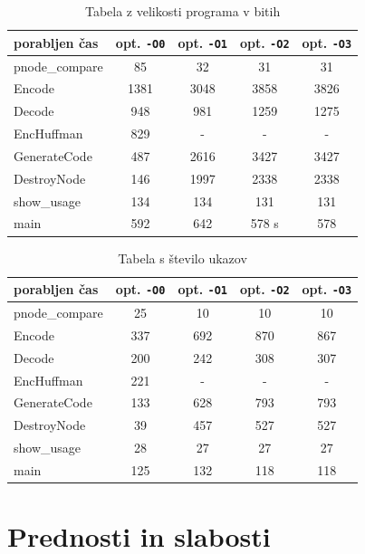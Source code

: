 \documentclass[a4paper, 12pt]{book}
\begin{document}
\begin{table}
	\begin{center}
		\begin{tabular}{l|cccc}
			porabljen čas & opt. {\tt -O0} & opt. {\tt -O1} & opt. {\tt -O2} & opt. {\tt -O3} \\ \hline
			pnode\_compare & 85 & 32 & 31 & 31 \\
			Encode & 1381 & 3048 & 3858 & 3826 \\
			Decode & 948 & 981 & 1259 & 1275 \\
			EncHuffman & 829 & - & - & - \\
			GenerateCode & 487 & 2616 & 3427 & 3427 \\
			DestroyNode & 146 & 1997 & 2338 & 2338 \\
			show\_usage & 134 & 134 & 131 & 131 \\
			main & 592 & 642 & 578 s & 578
		\end{tabular}
	\end{center}
	\caption{Tabela z velikosti programa v bitih}
	\label{tbl:9}
\end{table}

\begin{table}
	\begin{center}
		\begin{tabular}{l|cccc}
			porabljen čas & opt. {\tt -O0} & opt. {\tt -O1} & opt. {\tt -O2} & opt. {\tt -O3} \\ \hline
			pnode\_compare & 25 & 10 & 10 & 10 \\
			Encode & 337 & 692 & 870 & 867 \\
			Decode & 200 & 242 & 308 & 307 \\
			EncHuffman & 221 & - & - & - \\
			GenerateCode & 133 & 628 & 793 & 793 \\
			DestroyNode & 39 & 457 & 527 & 527 \\
			show\_usage & 28 & 27 & 27 & 27 \\
			main & 125 & 132 & 118 & 118
		\end{tabular}
	\end{center}
	\caption{Tabela s število ukazov}
	\label{tbl:10}
\end{table}

\section{Prednosti in slabosti}
\end{document}
